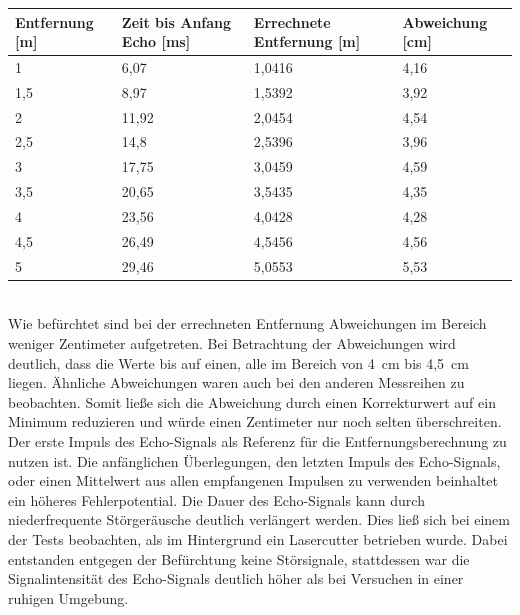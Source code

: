 \begin{minipage}{1\textwidth}
\begin{tabularx}{\textwidth}{|p{}|p{}|p{}|X|}
\hline
Entfernung [m]& Zeit bis Anfang Echo [ms]  & Errechnete Entfernung [m] & Abweichung [cm]\\
\hline
1 & 6,07 & 1,0416 & 4,16\\
\hline
1,5 & 8,97 & 1,5392 & 3,92\\
\hline
2 & 11,92 & 2,0454 & 4,54\\
\hline
2,5 & 14,8 & 2,5396 & 3,96\\
\hline
3 & 17,75 & 3,0459 & 4,59\\
\hline
3,5 & 20,65 & 3,5435 & 4,35\\
\hline
4 & 23,56 & 4,0428 & 4,28\\
\hline
4,5 & 26,49 & 4,5456 & 4,56\\
\hline
5 & 29,46 & 5,0553 & 5,53\\
\hline
\end{tabularx}

\label{tab:Entfernungsmessung}
\end{minipage}\\


Wie befürchtet sind bei der errechneten Entfernung Abweichungen im Bereich weniger Zentimeter aufgetreten. Bei Betrachtung der Abweichungen wird deutlich, dass die Werte bis auf einen, alle im Bereich von 4~cm bis 4,5~cm liegen. Ähnliche Abweichungen waren auch bei den anderen Messreihen zu beobachten. Somit ließe sich die Abweichung durch einen Korrekturwert auf ein Minimum reduzieren und würde einen Zentimeter nur noch selten überschreiten. Der erste Impuls des Echo-Signals als Referenz für die Entfernungsberechnung zu nutzen ist. Die anfänglichen Überlegungen, den letzten Impuls des Echo-Signals, oder einen Mittelwert aus allen empfangenen Impulsen zu verwenden beinhaltet ein höheres Fehlerpotential. Die Dauer des Echo-Signals kann durch niederfrequente Störgeräusche deutlich verlängert werden. Dies ließ sich bei einem der Tests beobachten, als im Hintergrund ein Lasercutter betrieben wurde. Dabei entstanden entgegen der Befürchtung keine Störsignale, stattdessen war die Signalintensität des Echo-Signals deutlich höher als bei Versuchen in einer ruhigen Umgebung. 
